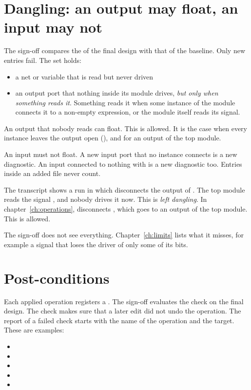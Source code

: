 \section{Dangling: an output may float, an input may not}

The sign-off compares the  of the final design with that of the
baseline. Only new entries fail. The set holds:

\begin{itemize}
\item a net or variable that is read but never driven
\item an output port that nothing inside its module drives, \emph{but only when
  something reads it}. Something reads it when some instance of the module connects it
  to a non-empty expression, or the module itself reads its signal.
\end{itemize}

An output that nobody reads can float. This is allowed. It is the case when
every instance leaves the output open (), and for an output of the top module.

An input must not float. A new input port that no instance connects is a new
diagnostic. An input connected to nothing with  is a new diagnostic too.
Entries inside an added file never count.

The transcript shows a run in which  disconnects the output
 of . The top module reads the signal , and nobody
drives it now. This is \emph{left dangling}. In chapter~\ref{ch:operations},
 disconnects , which goes to an output of the top
module. This is allowed.

The sign-off does not see everything. Chapter~\ref{ch:limits} lists what it misses,
for example a signal that loses the driver of only some of its bits.

\section{Post-conditions}

Each applied operation registers a . The sign-off evaluates the check on the
final design. The check makes sure that a later edit did not undo the operation. The
report of a failed check starts with the name of the operation and the target. These are
examples:

\begin{itemize}
\item {}
\item {}
\item {}
\item {}
\item {}
\end{itemize}

